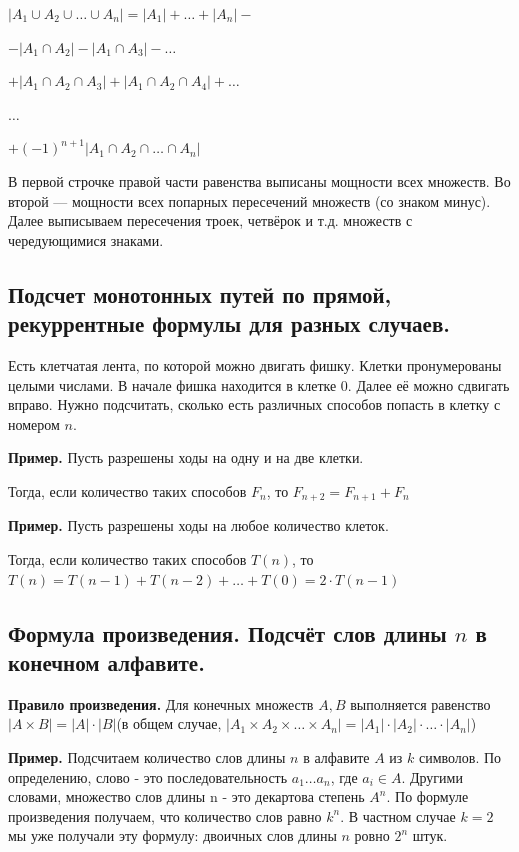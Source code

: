\documentclass[a4paper, 10pt]{article}
\begin{document}
\medskip

$|A_1 \cup A_2 \cup \dots \cup A_n| = |A_1| + \dots + |A_n| - $

$- |A_1 \cap A_2| - |A_1 \cap A_3| - \dots $

$+ |A_1 \cap A_2 \cap A_3| + |A_1 \cap A_2 \cap A_4| + \dots$

$\dots$

$+ (-1)^{n + 1} |A_1 \cap A_2 \cap \dots \cap A_n|$

\medskip

В первой строчке правой части равенства выписаны мощности всех множеств. Во второй — мощности всех попарных пересечений множеств (со знаком минус). Далее выписываем пересечения троек, четвёрок и т.д. множеств с чередующимися знаками.

\subsection{Подсчет монотонных путей по прямой, рекуррентные формулы для разных случаев.}

Есть клетчатая лента, по которой можно двигать фишку. Клетки пронумерованы целыми числами. В начале фишка находится в клетке 0. Далее её можно сдвигать вправо. Нужно подсчитать, сколько есть различных способов попасть в клетку с номером $n$.

\textbf{Пример.} Пусть разрешены ходы на одну и на две клетки.

Тогда, если  количество таких способов $F_n$, то $F_{n + 2} = F_{n+1} + F_n$

\textbf{Пример.} Пусть разрешены ходы на любое количество клеток.

Тогда, если количество таких способов $T(n)$, то $T(n) = T(n - 1) + T(n - 2) + \dots + T(0) = 2 \cdot T(n - 1)$

\subsection{Формула произведения. Подсчёт слов длины $n$ в конечном алфавите.}

\textbf{Правило произведения.} Для конечных множеств $A, B$ выполняется равенство $|A \times B| = |A| \cdot |B|$(в общем случае, $|A_1 \times A_2 \times \dots \times A_n| = |A_1| \cdot |A_2| \cdot \dots \cdot |A_n|$)

\textbf{Пример.} Подсчитаем количество слов длины $n$ в алфавите $A$ из $k$ символов. По определению, слово - это последовательность $a_1 \dots a_n$, где $a_i \in A$. Другими словами, множество слов длины n - это декартова степень $A^n$. По формуле произведения получаем, что количество слов равно $k^n$. В частном случае $k = 2$ мы уже получали эту формулу: двоичных слов длины $n$ ровно $2^n$ штук.
\end{document}
